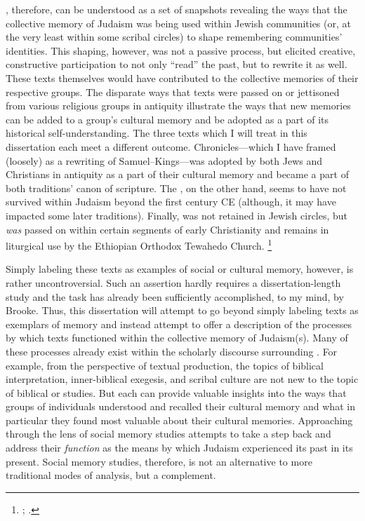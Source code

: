 \RwB, therefore, can be understood as a set of snapshots revealing the ways that the collective memory of \secondtemple Judaism was being used within Jewish communities (or, at the very least within some scribal circles) to shape remembering communities' identities. This shaping, however, was not a passive process, but elicited creative, constructive participation to not only ``read'' the past, but to rewrite it as well. These texts themselves would have contributed to the collective memories of their respective groups. The disparate ways that \rwb texts were passed on or jettisoned from various religious groups in antiquity illustrate the ways that new memories can be added to a group's cultural memory and be adopted as a part of its historical self-understanding. The three texts which I will treat in this dissertation each meet a different outcome. Chronicles---which I have framed (loosely) as a rewriting of Samuel--Kings---was adopted by both Jews and Christians in antiquity as a part of their cultural memory and became a part of both traditions' canon of scripture. The \ga, on the other hand, seems to have not survived within Judaism beyond the first century CE (although, it may have impacted some later traditions). Finally, \jub was not retained in Jewish circles, but \emph{was} passed on within certain segments of early Christianity and remains in liturgical use by the Ethiopian Orthodox Tewahedo Church.%
%
\footnote{\cite{baynes_mason-etal2012}; \cite{asale_bt2016}.}

Simply labeling these \rwb texts as examples of social or cultural memory, however, is rather uncontroversial. Such an assertion hardly requires a dissertation-length study and the task has already been sufficiently accomplished, to my mind, by Brooke.\autocite{brooke_zsengeller2014} Thus, this dissertation will attempt to go beyond simply labeling \rwb texts as exemplars of memory and instead attempt to offer a description of the processes by which \rwb texts functioned within the collective memory of \secondtemple Judaism(s). Many of these processes already exist within the scholarly discourse surrounding \rwb. For example, from the perspective of textual production, the topics of biblical interpretation, inner-biblical exegesis, and scribal culture are not new to the topic of biblical or \qumran studies. But each can provide valuable insights into the ways that groups of individuals understood and recalled their cultural memory and what in particular they found most valuable about their cultural memories. Approaching \rwb through the lens of social memory studies attempts to take a step back and address their \emph{function} as the means by which \secondtemple Judaism experienced its past in its present. Social memory studies, therefore, is not an alternative to more traditional modes of analysis, but a complement. 

